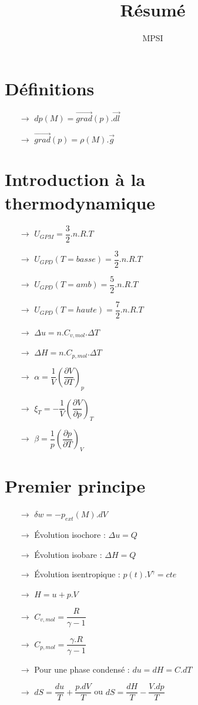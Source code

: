 \documentclass[a4paper,12pt,oneside]{report}
\title{Résumé}
\author{MPSI}
\begin{document}
\section{Définitions}
\begin{itemize}
 \item[$\rightarrow$] $dp(M) = \overrightarrow{grad}(p).\overrightarrow{dl}$
 \item[$\rightarrow$] $\overrightarrow{grad}(p) = \rho(M).\overrightarrow{g}$
\end{itemize}
\section{Introduction à la thermodynamique}
\begin{itemize}
 \item[$\rightarrow$] $U_{GPM} = \dfrac{3}{2}.n.R.T$
 \item[$\rightarrow$] $U_{GPD}(T=basse) = \dfrac{3}{2}.n.R.T$
 \item[$\rightarrow$] $U_{GPD}(T=amb) = \dfrac{5}{2}.n.R.T$
 \item[$\rightarrow$] $U_{GPD}(T=haute) = \dfrac{7}{2}.n.R.T$
\item[$\rightarrow$] $\Delta u = n.C_{v,mol}.\Delta T$
\item[$\rightarrow$] $\Delta H = n.C_{p,mol}.\Delta T$
\item[$\rightarrow$] $\alpha = \dfrac{1}{V}\left(\dfrac{\partial V}{\partial T} \right)_p $
\item[$\rightarrow$]$\xi_T = -\dfrac{1}{V}\left(\dfrac{\partial V}{\partial p} \right)_T$
\item[$\rightarrow$]$\beta = \dfrac{1}{p}\left(\dfrac{\partial p}{\partial T} \right)_V $
\end{itemize}
\section{Premier principe}
\begin{itemize}
 \item[$\rightarrow$] $\delta w = -p_{ext}(M).dV$ 
 \item[$\rightarrow$] Évolution isochore : $\Delta u = Q$
 \item[$\rightarrow$] Évolution isobare : $\Delta H = Q$
\item[$\rightarrow$] Évolution isentropique : $p(t).V^{\gamma} = cte$
 \item[$\rightarrow$] $H = u + p.V$
 \item[$\rightarrow$] $C_{v,mol}=\dfrac{R}{\gamma - 1}$
 \item[$\rightarrow$] $C_{p,mol}=\dfrac{\gamma.R}{\gamma - 1}$
 \item[$\rightarrow$] Pour une phase condensé : $du = dH = C.dT$
\item[$\rightarrow$] $dS = \dfrac{du}{T}+\dfrac{p.dV}{T}$ ou $dS = \dfrac{dH}{T}-\dfrac{V.dp}{T}$ 
\end{itemize}
\end{document}
